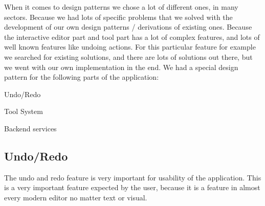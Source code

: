 When it comes to design patterns we chose a lot of different ones, in many sectors. Because we had lots of specific problems that we solved with the development of our own design patterns / derivations of existing ones. Because the interactive editor part and tool part has a lot of complex features, and lots of well known features like undoing actions. For this particular feature for example we searched for existing solutions, and there are lots of solutions out there, but we went with our own implementation in the end. We had a special design pattern for the following parts of the application:
\begin{compactitem}
\item Undo/Redo
\item Tool System
\item Backend services
\end{compactitem}

\subsection{Undo/Redo}

The undo and redo feature is very important for usability of the application. This is a very important feature expected by the user, because it is a feature in almost every modern editor no matter text or visual.